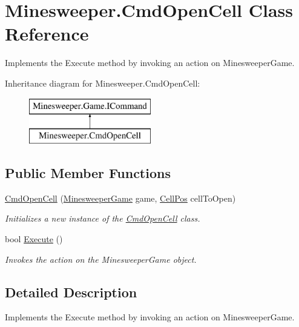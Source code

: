 \hypertarget{class_minesweeper_1_1_cmd_open_cell}{\section{Minesweeper.\+Cmd\+Open\+Cell Class Reference}
\label{class_minesweeper_1_1_cmd_open_cell}
}


Implements the Execute method by invoking an action on Minesweeper\+Game.  


Inheritance diagram for Minesweeper.\+Cmd\+Open\+Cell\+:\begin{figure}[H]
\begin{center}
\leavevmode
\includegraphics[height=2.000000cm]{class_minesweeper_1_1_cmd_open_cell}
\end{center}
\end{figure}
\subsection*{Public Member Functions}
\begin{DoxyCompactItemize}
\item 
\hyperlink{class_minesweeper_1_1_cmd_open_cell_a36a7f6680ff4e9ef21f09d52f452cdf3}{Cmd\+Open\+Cell} (\hyperlink{class_minesweeper_1_1_game_1_1_minesweeper_game}{Minesweeper\+Game} game, \hyperlink{struct_minesweeper_1_1_lib_1_1_cell_pos}{Cell\+Pos} cell\+To\+Open)
\begin{DoxyCompactList}\small\item\em Initializes a new instance of the \hyperlink{class_minesweeper_1_1_cmd_open_cell}{Cmd\+Open\+Cell} class. \end{DoxyCompactList}\item 
bool \hyperlink{class_minesweeper_1_1_cmd_open_cell_ad8627666ebddf09daf909b3c66173954}{Execute} ()
\begin{DoxyCompactList}\small\item\em Invokes the action on the Minesweeper\+Game object. \end{DoxyCompactList}\end{DoxyCompactItemize}


\subsection{Detailed Description}
Implements the Execute method by invoking an action on Minesweeper\+Game. 



